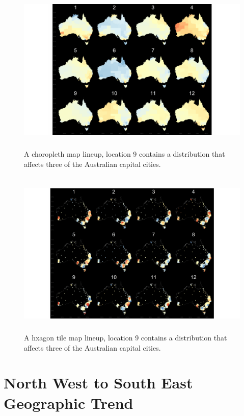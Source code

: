 \documentclass{monashthesis}
\begin{document}
\begin{figure}[H]
\centering
\includegraphics[height=8cm]{lineups/three-geo9-1.pdf}
\caption{\label{fig:three-geo9}A choropleth map lineup, location 9 contains a distribution that affects three of the Australian capital cities.}
\end{figure}

\begin{figure}[H]
\centering
\includegraphics[height=8cm]{lineups/three-hex9-1.pdf}
\caption{\label{fig:three-hex9}A hxagon tile map lineup, location 9 contains a distribution that affects three of the Australian capital cities.}
\end{figure}

\hypertarget{north-west-to-south-east-geographic-trend}{%
\section{North West to South East Geographic Trend}\label{north-west-to-south-east-geographic-trend}}
\end{document}
